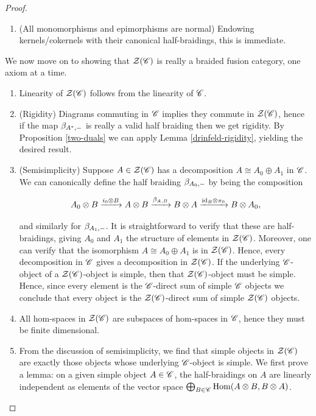 \documentclass{article}
\theoremstyle{definition}
\numberwithin{figure}{section}
\begin{document}
\begin{proof}
\begin{enumerate}
It is straightforward to show to show that $(\ker f,\beta_{\ker,\--})$ is a valid element of $\Zcal(\Ccat)$, and is the kernel of $f$. This completes the proof.

\item (All monomorphisms and epimorphisms are normal) Endowing kernels/cokernels with their canonical half-braidings, this is immediate.
\end{enumerate}

We now move on to showing that $\Zcal(\Ccat)$ is really a braided fusion category, one axiom at a time.

\begin{enumerate}
\item Linearity of $\Zcal(\Ccat)$ follows from the linearity of $\mathscr{C}$.

\item (Rigidity) Diagrams commuting in $\mathscr{C}$ implies they commute in $\Zcal(\Ccat)$, hence if the map $\beta_{A^*,\--}$ is really a valid half braiding then we get rigidity. By Proposition \ref{two-duals} we can apply Lemma \ref{drinfeld-rigidity}, yielding the desired result.

\item (Semisimplicity) Suppose $A\in \mathcal{Z}(\mathscr{C})$ has a decomposition $A\cong A_0\oplus A_1$ in $\mathscr{C}$. We can canonically define the half braiding $\beta_{A_0,\--}$ by being the composition

$$A_0\otimes B\xrightarrow{i_0\otimes B} A\otimes B \xrightarrow{\beta_{A,B}}B\otimes A \xrightarrow{\mathrm{id}_{B}\otimes \pi_{0}}B\otimes A_0,$$

and similarly for $\beta_{A_1,\--}$. It is straightforward to verify that these are half-braidings, giving $A_0$ and $A_1$ the structure of elements in $\Zcal(\Ccat)$. Moreover, one can verify that the isomorphism $A\cong A_0\oplus A_1$ is in $\Zcal(\Ccat)$. Hence, every decomposition in $\mathscr{C}$ gives a decomposition in $\Zcal(\Ccat)$. If the underlying $\mathscr{C}$-object of a $\Zcal(\Ccat)$-object is simple, then that $\Zcal(\Ccat)$-object must be simple. Hence, since every element is the $\mathscr{C}$-direct sum of simple $\mathscr{C}$ objects we conclude that every object is the $\Zcal(\Ccat)$-direct sum of simple $\Zcal(\Ccat)$ objects.

\item All hom-spaces in $\Zcal(\Ccat)$ are subspaces of hom-spaces in $\mathscr{C}$, hence they must be finite dimensional.

\item From the discussion of semisimplicity, we find that simple objects in $\Zcal(\Ccat)$ are exactly those objects whose underlying $\mathscr{C}$-object is simple. We first prove a lemma: on a given simple object $A\in \mathscr{C}$, the half-braidings on $A$ are linearly independent as elements of the vector space $\bigoplus_{B\in \mathscr{C}}\mathrm{Hom}(A\otimes B, B\otimes A)$.


\end{enumerate}
\end{proof}
\end{document}
